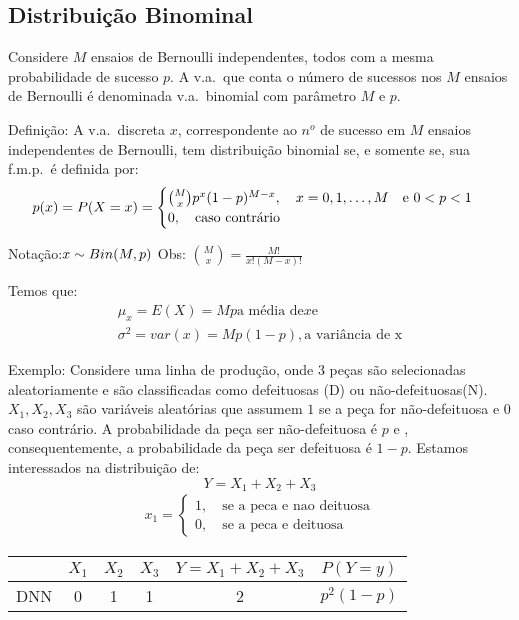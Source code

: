 \documentclass[11pt,a4paper]{book}
\begin{document}
 \subsection{Distribuição Binominal}
 Considere $M$ ensaios de Bernoulli independentes, todos com a mesma probabilidade
 de sucesso $p$. A v.a.\ que conta o número de sucessos nos $M$ ensaios de Bernoulli
 é denominada v.a.\ binomial com parâmetro $M$ e $p$.

 \begin{description}
   \item{Definição}: A v.a.\ discreta $x$, correspondente ao $n^o$ de sucesso em $M$ ensaios
     independentes de Bernoulli, tem distribuição binomial se, e somente se, sua 
     f.m.p.\ é definida por: 
     \begin{align}
       p(x)=P(X=x)=\begin{cases}
         \binom{M}{x}p^x (1-p)^{M-x}, \text{\quad}x=0,1,\dots,M \text{\quad e }0<p<1\\
         0, \text{\quad caso contrário}
       \end{cases}
     \end{align}

   \item{Notação}:$ x \sim Bin(M,p)\\$
     Obs: $\binom{M}{x}=\frac{M!}{x!(M-x)!}$

     Temos que: 
     \begin{align}
       \mu_{x}=E(X)=Mp\text{a média de} x \text{e}\\
       \sigma^2 =var(x)=Mp(1-p), \text{a variância de x}
     \end{align}
   \item{Exemplo}: Considere uma linha de produção, onde 3 peças são selecionadas aleatoriamente
     e são classificadas como defeituosas (D) ou não-defeituosas(N). $X_{1},X_{2},X_{3}$
     são variáveis aleatórias que assumem $1$ se a peça for não-defeituosa e $0$ caso 
     contrário. A probabilidade da peça ser não-defeituosa é $p$ e , consequentemente, 
     a probabilidade da peça ser defeituosa é $1-p$. Estamos interessados na distribuição
     de:
     $$Y=X_{1}+X_{2}+X_{3}$$
     \begin{align*}
       x_1 = \begin{cases}
         1, \quad \text{se a peca e nao deituosa}\\
         0, \quad \text{se a peca e deituosa}
       \end{cases}
     \end{align*}
     \begin{tabular}{c c c c c c }
       \toprule
       & $X_1$  & $X_2$ & $X_3$   & $Y= X_1 +X_2+ X_3$ & $ P(Y=y)$\\ \midrule
       DNN &0 & 1 & 1 & 2 & $p^2(1-p)$\\\midrule


\end{tabular}
\end{description}
\end{document}
